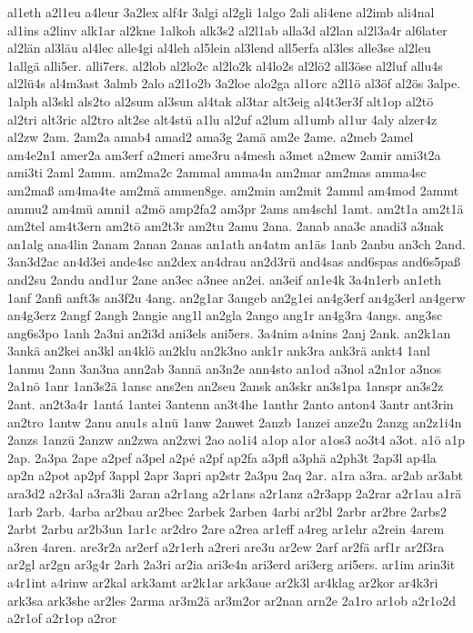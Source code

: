 {al1eth
a2l1eu
a4leur
3a2lex
alf4r
3algi
al2gli
1algo
2ali
ali4ene
al2imb
ali4nal
al1ins
a2linv
alk1ar
al2kne
1alkoh
alk3s2
al2l1ab
alla3d
al2lan
al2l3a4r
al6later
al2län
al3läu
al4lec
alle4gi
al4leh
al5lein
al3lend
all5erfa
al3les
alle3se
al2leu
1allgä
alli5er.
alli7ers.
al2lob
al2lo2c
al2lo2k
al4lo2s
al2lö2
all3öse
al2luf
allu4s
al2lü4s
al4m3ast
3almb
2alo
a2l1o2b
3a2loe
alo2ga
al1orc
a2l1ö
al3öf
al2ös
3alpe.
1alph
al3skl
als2to
al2sum
al3sun
al4tak
al3tar
alt3eig
al4t3er3f
alt1op
al2tö
al2tri
alt3ric
al2tro
alt2se
alt4stü
a1lu
al2uf
a2lum
al1umb
al1ur
4aly
alzer4z
al2zw
2am.
2am2a
amab4
amad2
ama3g
2amä
am2e
2ame.
a2meb
2amel
am4e2n1
amer2a
am3erf
a2meri
ame3ru
a4mesh
a3met
a2mew
2amir
ami3t2a
ami3ti
2aml
2amm.
am2ma2c
2ammal
amma4n
am2mar
am2mas
amma4sc
am2maß
am4ma4te
am2mä
ammen8ge.
am2min
am2mit
2amml
am4mod
2ammt
ammu2
am4mü
amni1
a2mö
amp2fa2
am3pr
2ams
am4schl
1amt.
am2t1a
am2t1ä
am2tel
am4t3ern
am2tö
am2t3r
am2tu
2amu
2ana.
2anab
ana3c
anadi3
a3nak
an1alg
ana4lin
2anam
2anan
2anas
an1ath
an4atm
an1äs
1anb
2anbu
an3ch
2and.
3an3d2ac
an4d3ei
ande4sc
an2dex
an4drau
an2d3rü
and4sas
and6spas
and6s5paß
and2su
2andu
and1ur
2ane
an3ec
a3nee
an2ei.
an3eif
an1e4k
3a4n1erb
an1eth
1anf
2anfi
anft3s
an3f2u
4ang.
an2g1ar
3angeb
an2g1ei
an4g3erf
an4g3erl
an4gerw
an4g3erz
2angf
2angh
2angie
ang1l
an2gla
2ango
ang1r
an4g3ra
4angs.
ang3sc
ang6s3po
1anh
2a3ni
an2i3d
ani3els
ani5ers.
3a4nim
a4nins
2anj
2ank.
an2k1an
3ankä
an2kei
an3kl
an4klö
an2klu
an2k3no
ank1r
ank3ra
ank3rä
ankt4
1anl
1anmu
2ann
3an3na
ann2ab
3annä
an3n2e
ann4sto
an1od
a3nol
a2n1or
a3nos
2a1nö
1anr
1an3s2ä
1ansc
ans2en
an2seu
2ansk
an3skr
an3s1pa
1anspr
an3s2z
2ant.
an2t3a4r
1antá
1antei
3antenn
an3t4he
1anthr
2anto
anton4
3antr
ant3rin
an2tro
1antw
2anu
anu1s
a1nü
1anw
2anwet
2anzb
1anzei
anze2n
2anzg
an2z1i4n
2anzs
1anzü
2anzw
an2zwa
an2zwi
2ao
ao1i4
a1op
a1or
a1os3
ao3t4
a3ot.
a1ö
a1p
2ap.
2a3pa
2ape
a2pef
a3pel
a2pé
a2pf
ap2fa
a3pfl
a3phä
a2ph3t
2ap3l
ap4la
ap2n
a2pot
ap2pf
3appl
2apr
3apri
ap2str
2a3pu
2aq
2ar.
a1ra
a3ra.
ar2ab
ar3abt
ara3d2
a2r3al
a3ra3li
2aran
a2r1ang
a2r1ans
a2r1anz
a2r3app
2a2rar
a2r1au
a1rä
1arb
2arb.
4arba
ar2bau
ar2bec
2arbek
2arben
4arbi
ar2bl
2arbr
ar2bre
2arbs2
2arbt
2arbu
ar2b3un
1ar1c
ar2dro
2are
a2rea
ar1eff
a4reg
ar1ehr
a2rein
4arem
a3ren
4aren.
are3r2a
ar2erf
a2r1erh
a2reri
are3u
ar2ew
2arf
ar2fä
arf1r
ar2f3ra
ar2gl
ar2gn
ar3g4r
2arh
2a3ri
ar2ia
ari3e4n
ari3erd
ari3erg
ari5ers.
ar1im
arin3it
a4r1int
a4rinw
ar2kal
ark3amt
ar2k1ar
ark3aue
ar2k3l
ar4klag
ar2kor
ar4k3ri
ark3sa
ark3she
ar2les
2arma
ar3m2ä
ar3m2or
ar2nan
arn2e
2a1ro
ar1ob
a2r1o2d
a2r1of
a2r1op
a2ror
}
